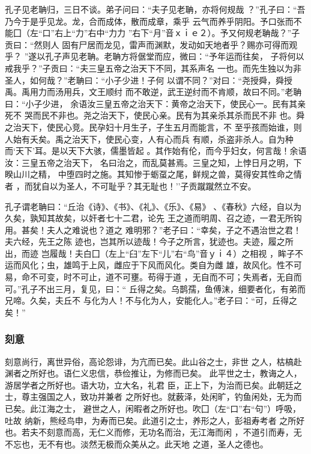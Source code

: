 \documentclass[]{article}
\begin{document}
孔子见老聃归，三日不谈。弟子问曰：``夫子见老聃，亦将何规哉
？''孔子曰：``吾乃今于是乎见龙。龙，合而成体，散而成章，乘乎
云气而养乎阴阳。予口张而不能囗（左``口''右上``力''右中``力力
''右下``月''音ｘｉｅ２）。予又何规老聃哉？''子贡曰：``然则人
固有尸居而龙见，雷声而渊默，发动如天地者乎？赐亦可得而观乎？
''遂以孔子声见老聃。老聃方将倨堂而应，微曰：``予年运而往矣，
子将何以戒我乎？''子贡曰：``夫三皇五帝之治天下不同，其系声名
一也。而先生独以为非圣人，如何哉？''老聃曰：``小子少进！子何
以谓不同？''对曰：``尧授舜，舜授禹。禹用力而汤用兵，文王顺纣
而不敢逆，武王逆纣而不肯顺，故曰不同。''老聃曰：``小子少进，
余语汝三皇五帝之治天下：黄帝之治天下，使民心一。民有其亲死不
哭而民不非也。尧之治天下，使民心亲。民有为其亲杀其杀而民不非
也。舜之治天下，使民心竞。民孕妇十月生子，子生五月而能言，不
至乎孩而始谁，则人始有夭矣。禹之治天下，使民心变，人有心而兵
有顺，杀盗非杀人。自为种而`天下'耳。是以天下大骇，儒墨皆起
。其作始有伦，而今乎妇女，何言哉！余语汝：三皇五帝之治天下，
名曰治之，而乱莫甚焉。三皇之知，上悖日月之明，下睽山川之精，
中堕四时之施。其知惨于蛎虿之尾，鲜规之兽，莫得安其性命之情者
，而犹自以为圣人，不可耻乎？其无耻也！''子贡蹴蹴然立不安。

孔子谓老聃曰：``丘治《诗》、《书》、《礼》、《乐》、《易》
、《春秋》六经，自以为久矣，孰知其故矣，以奸者七十二君，论先
王之道而明周、召之迹，一君无所钩用。甚矣！夫人之难说也？道之
难明邪？''老子曰：``幸矣，子之不遇治世之君！夫六经，先王之陈
迹也，岂其所以迹哉！今子之所言，犹迹也。夫迹，履之所出，而迹
岂履哉！夫白囗（左上``臼''左下``儿''右``鸟''音ｙｉ４）之相视
，眸子不运而风化；虫，雄鸣于上风，雌应于下风而风化。类自为雌
雄，故风化。性不可易，命不可变，时不可止，道不可壅。苟得于道
，无自而不可；失焉者，无自而可。''孔子不出三月，复见，曰：``
丘得之矣。乌鹊孺，鱼傅沫，细要者化，有弟而兄啼。久矣，夫丘不
与化为人！不与化为人，安能化人。''老子曰：``可，丘得之矣！''

\hypertarget{header-n2182}{%
\subsubsection{刻意}\label{header-n2182}}

刻意尚行，离世异俗，高论怨诽，为亢而已矣。此山谷之士，非世
之人，枯槁赴渊者之所好也。语仁义忠信，恭俭推让，为修而已矣。
此平世之士，教诲之人，游居学者之所好也。语大功，立大名，礼君
臣，正上下，为治而已矣。此朝廷之士，尊主强国之人，致功并兼者
之所好也。就薮泽，处闲旷，钓鱼闲处，无为而已矣。此江海之士，
避世之人，闲暇者之所好也。吹囗（左``口''右``句''）呼吸，吐故
纳新，熊经鸟申，为寿而已矣。此道引之士，养形之人，彭祖寿考者
之所好也。若夫不刻意而高，无仁义而修，无功名而治，无江海而闲
，不道引而寿，无不忘也，无不有也。淡然无极而众美从之。此天地
之道，圣人之德也。
\end{document}
